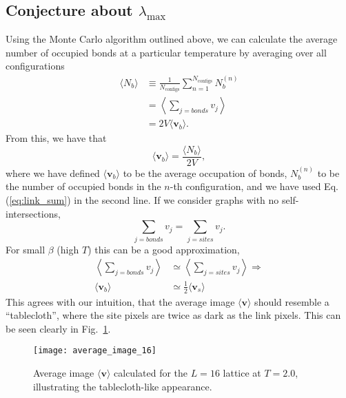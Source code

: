 \documentclass[../main.tex]{subfiles}
\begin{document}
\subsection{Conjecture about \texorpdfstring{$\lambda_{\max}$}{λmax}}%
\label{ssec:conjecture}
Using the Monte Carlo algorithm outlined above, we can calculate the average
number of occupied bonds at a particular temperature by averaging over all
configurations
%
\begin{align}
    \langle N_b\rangle
        &\equiv \frac{1}{N_{\mathrm{configs}}}\sum_{n=1}^{N_{\mathrm{\mathrm{configs}}}} N_b^{(n)}\\
        &= \left\langle \sum_{j=bonds} v_j \right\rangle \\
        &= 2V\langle \mathbf{v}_b\rangle.
    \label{eq:link_avg}
\end{align}
%
From this, we have that
%
\begin{equation}
    \langle \mathbf{v}_b\rangle = \frac{\langle N_b\rangle}{2V},
\end{equation}
%
where we have defined $\langle \mathbf{v}_b\rangle$ to be the average
occupation of bonds, $N_b^{(n)}$ to be the number of occupied bonds in the
$n$-th configuration, and we have used Eq. (\ref{eq:link_sum}) in the second
line. If we consider graphs with no self-intersections,
%
\begin{equation}
    \sum_{j=bonds} v_j = \sum_{j=sites} v_j.
    \label{bonds_equal_sites}
\end{equation}
%
For small $\beta$ (high $T$) this can be a good approximation,
%
\begin{align}
    \left\langle \sum_{j=bonds} v_j \right\rangle &\simeq \left\langle
    \sum_{j=sites} v_j\right\rangle\Longrightarrow\\
    \langle\mathbf{v}_b\rangle &\simeq \frac{1}{2}\langle\mathbf{v}_s\rangle
    \label{avg_bonds_equal_sites}
\end{align}
%
This agrees with our intuition, that the average image $\langle
\mathbf{v}\rangle$ should resemble a ``tablecloth'', where the site pixels are
twice as dark as the link pixels. This can be seen clearly in
Fig.~\ref{fig:average_image}.
%
\begin{figure}[htpb]
    \centering
    \texttt{[image: average\_image\_16]}
    \caption{Average image $\langle \mathbf{v}\rangle$ calculated for the
        $L = 16$ lattice at $T = 2.0$, illustrating the
        tablecloth-like appearance.}%
\label{fig:average_image}
\end{figure}
\end{document}
